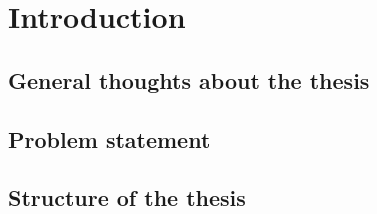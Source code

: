 \chapter{Introduction}
\label{chapter:intro}

\section{General thoughts about the thesis}
\section{Problem statement}
\section{Structure of the thesis}

